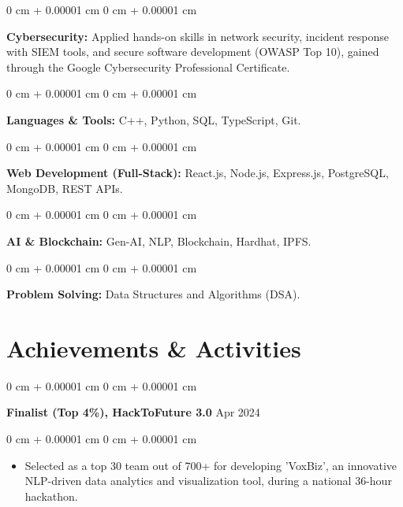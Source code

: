 \documentclass[10pt, letterpaper]{article}
\newenvironment{highlights}{
    \begin{itemize}[
        topsep=0.10 cm,
        parsep=0.10 cm,
        partopsep=0pt,
        itemsep=0pt,
        leftmargin=0 cm + 10pt
    ]
}{
    \end{itemize}
} %
\newenvironment{onecolentry}{
    \begin{adjustwidth}{
        0 cm + 0.00001 cm
    }{
        0 cm + 0.00001 cm
    }
}{
    \end{adjustwidth}
} %
\newenvironment{twocolentry}[2][]{
    \onecolentry
    \def\secondColumn{#2}
    \setcolumnwidth{\fill, 4.5 cm}
    \begin{paracol}{2}
}{
    \switchcolumn \raggedleft \secondColumn
    \end{paracol}
    \endonecolentry
} %
\begin{document}
        \begin{onecolentry}
            \textbf{Cybersecurity:} Applied hands-on skills in network security, incident response with SIEM tools, and secure software development (OWASP Top 10), gained through the Google Cybersecurity Professional Certificate.
        \end{onecolentry}

        \vspace{0.2 cm}

        \begin{onecolentry}
            \textbf{Languages \& Tools:} C++, Python, SQL, TypeScript, Git.
        \end{onecolentry}

        \vspace{0.2 cm}

        \begin{onecolentry}
            \textbf{Web Development (Full-Stack):} React.js, Node.js, Express.js, PostgreSQL, MongoDB, REST APIs.
        \end{onecolentry}

        \vspace{0.2 cm}

        \begin{onecolentry}
            \textbf{AI \& Blockchain:} Gen-AI, NLP, Blockchain, Hardhat, IPFS.
        \end{onecolentry}

        \vspace{0.2 cm}

        \begin{onecolentry}
            \textbf{Problem Solving:} Data Structures and Algorithms (DSA).
        \end{onecolentry}

    \section{Achievements \& Activities}

        \begin{twocolentry}{
            Apr 2024
        }
            \textbf{Finalist (Top 4\%), HackToFuture 3.0}\end{twocolentry}

        \vspace{0.05 cm}
        \begin{onecolentry}
            \begin{highlights}
                \item Selected as a top 30 team out of 700+ for developing 'VoxBiz', an innovative NLP-driven data analytics and visualization tool, during a national 36-hour hackathon.
            \end{highlights}
        \end{onecolentry}
\end{document}
